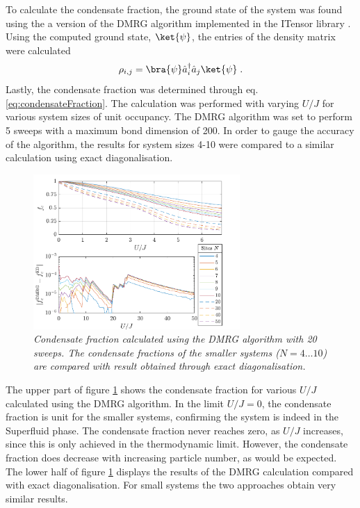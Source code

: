 To calculate the condensate fraction, the ground state of the system was found using the a version of the DMRG algorithm implemented in the ITensor library \cite{ITensor}. Using the computed ground state, $\ket{\psi}$, the entries of the density matrix were calculated
\begin{equation}
	\rho_{i,j} = \bra{\psi} \hat{a}_{i}^{\dag} \hat{a}_{j} \ket{\psi} \; .
\end{equation}
Lastly, the condensate fraction was determined through eq. \eqref{eq:condensateFraction}.
The calculation was performed with varying $U/J$ for various system sizes of unit occupancy. The DMRG algorithm was set to perform 5 sweeps with a maximum bond dimension of 200.
In order to gauge the accuracy of the algorithm, the results for system sizes 4-10 were compared to a similar calculation using exact diagonalisation.
\begin{figure}[h!]
    \centering
    \includegraphics[width=0.7\textwidth]{Figures/CondensateFractionCompare.pdf}
 \caption{\textit{Condensate fraction calculated using the DMRG algorithm with 20 sweeps. The condensate fractions of the smaller systems ($N = 4 \ldots 10$) are compared with result obtained through exact diagonalisation.}}
 \label{fig:CondensateFraction}
\end{figure}
The upper part of figure \ref{fig:CondensateFraction} shows the condensate fraction for various $U/J$ calculated using the DMRG algorithm. In the limit $U/J = 0$, the condensate fraction is unit for the smaller systems, confirming the system is indeed in the Superfluid phase. The condensate fraction never reaches zero, as $U/J$ increases, since this is only achieved in the thermodynamic limit. However, the condensate fraction does decrease with increasing particle number, as would be expected. The lower half of figure \ref{fig:CondensateFraction}  displays the results of the DMRG calculation compared with exact diagonalisation. For small systems the two approaches obtain very similar results.\\
